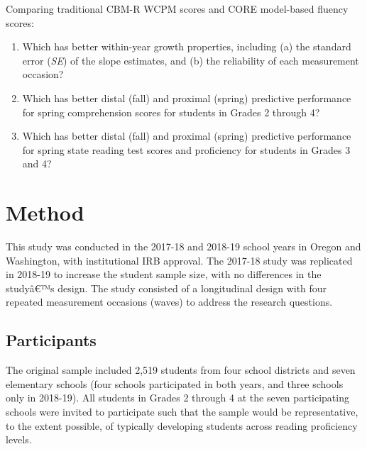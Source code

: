 \documentclass[
  english,
  man, fleqn, noextraspace]{apa6}
\begin{document}
Comparing traditional CBM-R WCPM scores and CORE model-based fluency scores:

\begin{enumerate}
\def\labelenumi{(\arabic{enumi})}
\item
  Which has better within-year growth properties, including (a) the standard error (\emph{SE}) of the slope estimates, and (b) the reliability of each measurement occasion?
\item
  Which has better distal (fall) and proximal (spring) predictive performance for spring comprehension scores for students in Grades 2 through 4?
\item
  Which has better distal (fall) and proximal (spring) predictive performance for spring state reading test scores and proficiency for students in Grades 3 and 4?
\end{enumerate}

\hypertarget{method}{%
\section{Method}\label{method}}

This study was conducted in the 2017-18 and 2018-19 school years in Oregon and Washington, with institutional IRB approval. The 2017-18 study was replicated in 2018-19 to increase the student sample size, with no differences in the studyâ€™s design. The study consisted of a longitudinal design with four repeated measurement occasions (waves) to address the research questions.

\hypertarget{participants}{%
\subsection{Participants}\label{participants}}

The original sample included 2,519 students from four school districts and seven elementary schools (four schools participated in both years, and three schools only in 2018-19). All students in Grades 2 through 4 at the seven participating schools were invited to participate such that the sample would be representative, to the extent possible, of typically developing students across reading proficiency levels.
\end{document}
